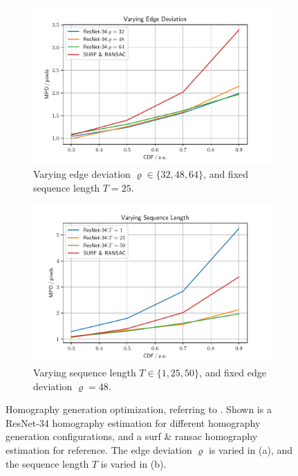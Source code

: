 \begin{figure}[tb]
\centering
\begin{subfigure}[b]{0.49\textwidth}
    \centering
    \includegraphics[width=\textwidth]{fig/frac/var_rho.pdf}
    \caption{Varying edge deviation $\varrho\in\{32,48,64\}$, and fixed sequence length $T=25$.}
    \label{c3:fig:resnet34_a}
\end{subfigure}
\begin{subfigure}[b]{0.49\textwidth}
    \centering
    \includegraphics[width=\textwidth]{fig/frac/var_seq.pdf}
    \caption{Varying sequence length $T\in\{1,25,50\}$, and fixed edge deviation $\varrho=48$.}
    \label{c3:fig:resnet34_b}
\end{subfigure}
\caption{Homography generation optimization, referring to . Shown is a ResNet-34 homography estimation for different homography generation configurations, and a \gls{surf} \& \gls{ransac} homography estimation for reference. The edge deviation $\varrho$ is varied in (a), and the sequence length $T$ is varied in (b).}
\label{c3:fig:resnet34}
\end{figure}


